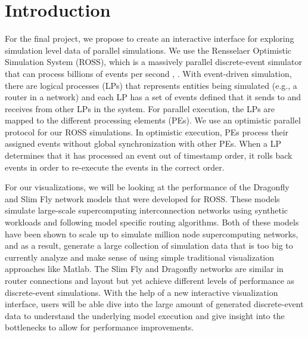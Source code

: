 \documentclass{acm_proc_article-sp}
\begin{document}
\maketitle
%
%

%
%


%
%

%
%



\section{Introduction}
For the final project, we propose to create an interactive interface for exploring simulation level data of parallel simulations.  We use the Rensselaer Optimistic Simulation System (ROSS), which is a massively parallel discrete-event simulator that can process billions of events per second \cite{Holder}, \cite{Bauer}.  With event-driven simulation, there are logical processes (LPs) that represents entities being simulated (e.g., a router in a network) and each LP has a set of events defined that it sends to and receives from other LPs in the system.  For parallel execution, the LPs are mapped to the different processing elements (PEs). We use an optimistic parallel protocol for our ROSS simulations.  In optimistic execution, PEs process their assigned events without global synchronization with other PEs.  When a LP determines that it has processed an event out of timestamp order, it rolls back events in order to re-execute the events in the correct order.

For our visualizations, we will be looking at the performance of the Dragonfly and Slim Fly network models that were developed for ROSS. These models simulate large-scale supercomputing interconnection networks using synthetic workloads and following model specific routing algorithms. Both of these models have been shown to scale up to simulate million node supercomputing networks, and as a result, generate a large collection of simulation data that is too big to currently analyze and make sense of using simple traditional visualization approaches like Matlab. The Slim Fly and Dragonfly networks are similar in router connections and layout but yet achieve different levels of performance as discrete-event simulations. With the help of a new interactive visualization interface, users will be able dive into the large amount of generated discrete-event data to understand the underlying model execution and give insight into the bottlenecks to allow for performance improvements. 
\end{document}
